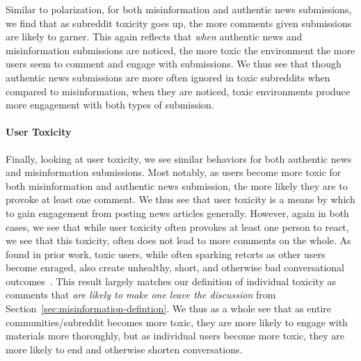 Similar to polarization, for both misinformation and authentic news submissions, we find that as subreddit toxicity goes up, the more comments given submissions are likely to garner. This again reflects that \emph{when} authentic news and misinformation submissions are noticed, the more toxic the environment the more users seem to comment and engage with submissions. We thus see that though authentic news submissions are more often ignored in toxic subreddits when compared to misinformation, when they are noticed, toxic environments produce more engagement with both types of submission. 

\paragraph{User Toxicity}  Finally, looking at user toxicity, we see similar behaviors for both authentic news and misinformation submissions. Most notably, as users become more toxic for both misinformation and authentic news submission, the more likely they are to provoke at least one comment. We thus see that user toxicity is a means by which to gain engagement from posting news articles generally. However, again in both cases, we see that while user toxicity often provokes at least one person to react, we see that this toxicity, often does not lead to more comments on the whole. As found in prior work, toxic users, while often sparking retorts as other users become enraged, also create unhealthy, short, and otherwise bad conversational outcomes~\cite{saveski2021structure,kumar2021designing}. This result largely matches our definition of individual toxicity as comments that \textit{are likely to make one leave the discussion} from Section~\ref{sec:misinformation-defintion}. We thus as a whole see that as entire communities/subreddit becomes more toxic, they are more likely to engage with materials more thoroughly, but as individual users become more toxic, they are more likely to end and otherwise shorten conversations. 






